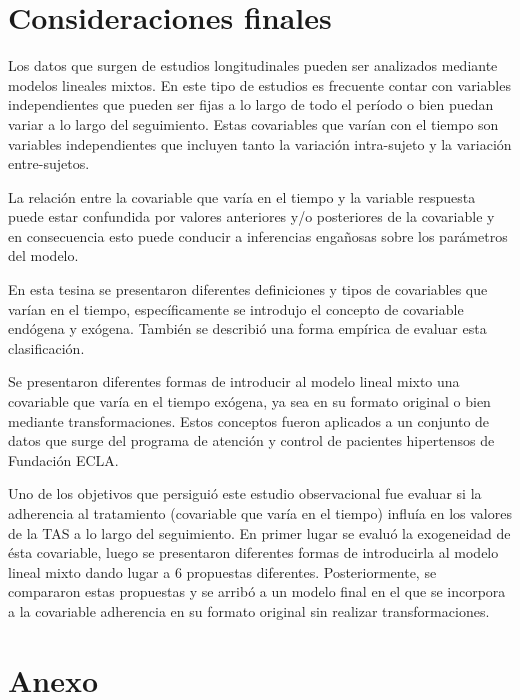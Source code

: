 \documentclass[spanish]{article}
\numberwithin{figure}{subsection}
\numberwithin{equation}{subsection}
\numberwithin{table}{subsection}
\begin{document}
\newpage

\section{Consideraciones finales}

Los datos que surgen de estudios longitudinales pueden ser analizados mediante
modelos lineales mixtos. En este tipo de estudios es frecuente contar con
variables independientes que pueden ser fijas a lo largo de todo el período o
bien puedan variar a lo largo del seguimiento. Estas covariables que varían con
el tiempo son variables independientes que incluyen tanto la variación
intra-sujeto y la variación entre-sujetos.

La relación entre la covariable que varía en el tiempo y la variable respuesta
puede estar confundida por valores anteriores y/o posteriores de la covariable y
en consecuencia esto puede conducir a inferencias engañosas sobre los parámetros
del modelo.

En esta tesina se presentaron diferentes definiciones y tipos de covariables que
varían en el tiempo, específicamente se introdujo el concepto de covariable
endógena y exógena. También se describió una forma empírica de evaluar esta
clasificación.

Se presentaron diferentes formas de introducir al modelo lineal mixto una
covariable que varía en el tiempo exógena, ya sea en su formato original o bien
mediante transformaciones. Estos conceptos fueron aplicados a un conjunto de
datos que surge del programa de atención y control de pacientes hipertensos de
Fundación ECLA.

Uno de los objetivos que persiguió este estudio observacional fue evaluar si la
adherencia al tratamiento (covariable que varía en el tiempo) influía en los
valores de la TAS a lo largo del seguimiento. En primer lugar se evaluó la
exogeneidad de ésta covariable, luego se presentaron diferentes formas de
introducirla al modelo lineal mixto dando lugar a 6 propuestas diferentes.
Posteriormente, se compararon estas propuestas y se arribó a un modelo final en
el que se incorpora a la covariable adherencia en su formato original sin
realizar transformaciones.

\newpage

\section{Anexo}
\end{document}
